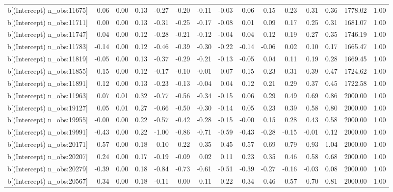 \begin{table}[ht]
\begin{tabular}{rrrrrrrrrrrrrrr}
  b[(Intercept) n\_obs:11675] & 0.06 & 0.00 & 0.13 & -0.27 & -0.20 & -0.11 & -0.03 & 0.06 & 0.15 & 0.23 & 0.31 & 0.36 & 1778.02 & 1.00 \\ 
  b[(Intercept) n\_obs:11711] & 0.00 & 0.00 & 0.13 & -0.31 & -0.25 & -0.17 & -0.08 & 0.01 & 0.09 & 0.17 & 0.25 & 0.31 & 1681.07 & 1.00 \\ 
  b[(Intercept) n\_obs:11747] & 0.04 & 0.00 & 0.12 & -0.28 & -0.21 & -0.12 & -0.04 & 0.04 & 0.12 & 0.19 & 0.27 & 0.35 & 1746.19 & 1.00 \\ 
  b[(Intercept) n\_obs:11783] & -0.14 & 0.00 & 0.12 & -0.46 & -0.39 & -0.30 & -0.22 & -0.14 & -0.06 & 0.02 & 0.10 & 0.17 & 1665.47 & 1.00 \\ 
  b[(Intercept) n\_obs:11819] & -0.05 & 0.00 & 0.13 & -0.37 & -0.29 & -0.21 & -0.13 & -0.05 & 0.04 & 0.11 & 0.19 & 0.28 & 1669.45 & 1.00 \\ 
  b[(Intercept) n\_obs:11855] & 0.15 & 0.00 & 0.12 & -0.17 & -0.10 & -0.01 & 0.07 & 0.15 & 0.23 & 0.31 & 0.39 & 0.47 & 1724.62 & 1.00 \\ 
  b[(Intercept) n\_obs:11891] & 0.12 & 0.00 & 0.13 & -0.23 & -0.13 & -0.04 & 0.04 & 0.12 & 0.21 & 0.29 & 0.37 & 0.45 & 1722.58 & 1.00 \\ 
  b[(Intercept) n\_obs:11963] & 0.07 & 0.01 & 0.32 & -0.77 & -0.56 & -0.34 & -0.15 & 0.06 & 0.29 & 0.49 & 0.69 & 0.86 & 2000.00 & 1.00 \\ 
  b[(Intercept) n\_obs:19127] & 0.05 & 0.01 & 0.27 & -0.66 & -0.50 & -0.30 & -0.14 & 0.05 & 0.23 & 0.39 & 0.58 & 0.80 & 2000.00 & 1.00 \\ 
  b[(Intercept) n\_obs:19955] & -0.00 & 0.00 & 0.22 & -0.57 & -0.42 & -0.28 & -0.15 & -0.00 & 0.15 & 0.28 & 0.43 & 0.58 & 2000.00 & 1.00 \\ 
  b[(Intercept) n\_obs:19991] & -0.43 & 0.00 & 0.22 & -1.00 & -0.86 & -0.71 & -0.59 & -0.43 & -0.28 & -0.15 & -0.01 & 0.12 & 2000.00 & 1.00 \\ 
  b[(Intercept) n\_obs:20171] & 0.57 & 0.00 & 0.18 & 0.10 & 0.22 & 0.35 & 0.45 & 0.57 & 0.69 & 0.79 & 0.93 & 1.04 & 2000.00 & 1.00 \\ 
  b[(Intercept) n\_obs:20207] & 0.24 & 0.00 & 0.17 & -0.19 & -0.09 & 0.02 & 0.11 & 0.23 & 0.35 & 0.46 & 0.58 & 0.68 & 2000.00 & 1.00 \\ 
  b[(Intercept) n\_obs:20279] & -0.39 & 0.00 & 0.18 & -0.84 & -0.73 & -0.61 & -0.51 & -0.39 & -0.27 & -0.16 & -0.03 & 0.08 & 2000.00 & 1.00 \\ 
  b[(Intercept) n\_obs:20567] & 0.34 & 0.00 & 0.18 & -0.11 & 0.00 & 0.11 & 0.22 & 0.34 & 0.46 & 0.57 & 0.70 & 0.81 & 2000.00 & 1.00 \\ 

\end{tabular}
\end{table}
